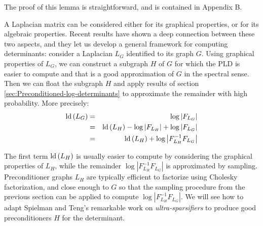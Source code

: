 The proof of this lemma is straightforward, and is contained in Appendix
B.

A Laplacian matrix can be considered either for its graphical properties,
or for its algebraic properties. Recent results have shown a deep
connection between these two aspects, and they let us develop a general
framework for computing determinants: consider a Laplacian $L_{G}$
identified to its graph $G$. Using graphical properties of $L_{G}$,
we can construct a subgraph $H$ of $G$ for which the PLD is easier
to compute and that is a good approximation of $G$ in the spectral
sense. Then we can float the subgraph $H$ and apply results of section
\ref{sec:Preconditioned-log-determinants} to approximate the remainder
with high probability. More precisely: 
\begin{eqnarray*}
\text{\textnormal{ld}}\left(L_{G}\right) & = & \log\left|F_{L_{G}}\right|\\
 & = & \text{\textnormal{ld}}\left(L_{H}\right)-\log\left|F_{L_{H}}\right|+\log\left|F_{L_{G}}\right|\\
 & = & \text{\textnormal{ld}}\left(L_{H}\right)+\log\left|F_{L_{H}}^{-1}F_{L_{G}}\right|
\end{eqnarray*}


The first term $\text{\textnormal{ld}}\left(L_{H}\right)$ is usually easier to compute
by considering the graphical properties of $L_{H}$, while the remainder
$\log\left|F_{L_{H}}^{-1}F_{L_{G}}\right|$ is approximated by sampling.
Preconditioner graphs $L_{H}$ are typically efficient to factorize
using Cholesky factorization, and close enough to $G$ so that the
sampling procedure from the previous section can be applied to compute
$\log\left|F_{L_{H}}^{-1}F_{L_{G}}\right|$. We will see how to adapt
Spielman and Teng's remarkable work on \emph{ultra-sparsifiers} to
produce good preconditioners $H$ for the determinant. 
